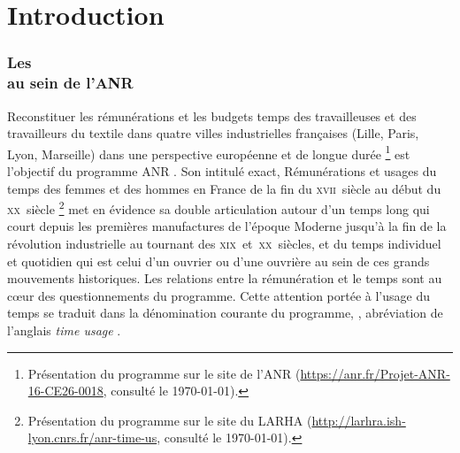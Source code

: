 \part*{Introduction}

\begin{center}
    \section*{Les \odm\\au sein de l'ANR \timeus}
\end{center}

\bigbreak

\bigbreak

\og Reconstituer les rémunérations et les budgets temps des travailleuses et des travailleurs du textile dans quatre villes industrielles françaises (Lille, Paris, Lyon, Marseille) dans une perspective européenne et de longue durée \fg{}\footnote{Présentation du programme sur le site de l'ANR (\url{https://anr.fr/Projet-ANR-16-CE26-0018}, consulté le \today).} est l'objectif du programme ANR \timeus. Son intitulé exact, \og Rémunérations et usages du temps des femmes et des hommes en France de la fin du \textsc{xvii}\ieme ~siècle au début du \textsc{xx}\ieme ~siècle \fg{}\footnote{Présentation du programme sur le site du LARHA (\url{http://larhra.ish-lyon.cnrs.fr/anr-time-us}, consulté le \today).} met en évidence sa double articulation autour d'un temps long qui court depuis les premières manufactures de l'époque Moderne jusqu'à la fin de la révolution industrielle au tournant des \textsc{xix}\ieme  ~et~\textsc{xx}\ieme ~siècles, et du temps individuel et quotidien qui est celui d'un ouvrier ou d'une ouvrière au sein de ces grands mouvements historiques. Les relations entre la rémunération et le temps sont au c\oe{}ur des questionnements du programme. Cette attention portée à l'usage du temps se traduit dans la dénomination courante du programme, \og \timeus{} \fg{}, abréviation de l'anglais \og \textit{time usage} \fg{}.

